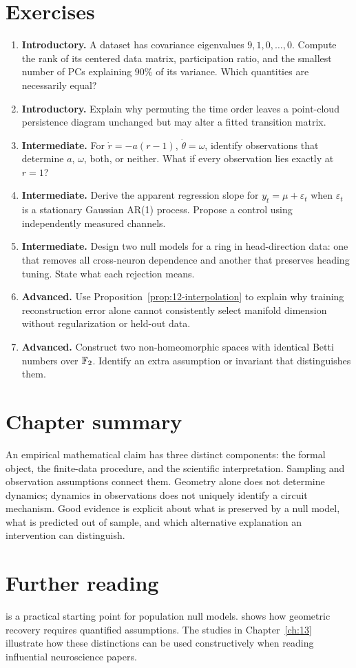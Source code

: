 \section*{Exercises}
\begin{enumerate}
\item \textbf{Introductory.} A dataset has covariance eigenvalues \(9,1,0,\ldots,0\). Compute the rank of its centered data matrix, participation ratio, and the smallest number of PCs explaining \(90\%\) of its variance. Which quantities are necessarily equal?
\item \textbf{Introductory.} Explain why permuting the time order leaves a point-cloud persistence diagram unchanged but may alter a fitted transition matrix.
\item \textbf{Intermediate.} For \(\dot r=-a(r-1)\), \(\dot\theta=\omega\), identify observations that determine \(a\), \(\omega\), both, or neither. What if every observation lies exactly at \(r=1\)?
\item \textbf{Intermediate.} Derive the apparent regression slope for \(y_t=\mu+\varepsilon_t\) when \(\varepsilon_t\) is a stationary Gaussian AR(1) process. Propose a control using independently measured channels.
\item \textbf{Intermediate.} Design two null models for a ring in head-direction data: one that removes all cross-neuron dependence and another that preserves heading tuning. State what each rejection means.
\item \textbf{Advanced.} Use Proposition~\ref{prop:12-interpolation} to explain why training reconstruction error alone cannot consistently select manifold dimension without regularization or held-out data.
\item \textbf{Advanced.} Construct two non-homeomorphic spaces with identical Betti numbers over \(\mathbb{F}_2\). Identify an extra assumption or invariant that distinguishes them.
\end{enumerate}

\section*{Chapter summary}
An empirical mathematical claim has three distinct components: the formal object, the finite-data procedure, and the scientific interpretation. Sampling and observation assumptions connect them. Geometry alone does not determine dynamics; dynamics in observations does not uniquely identify a circuit mechanism. Good evidence is explicit about what is preserved by a null model, what is predicted out of sample, and which alternative explanation an intervention can distinguish.

\section*{Further reading}
\citet{ev_elsayed2017} is a practical starting point for population null models. \citet{ev_niyogi2008} shows how geometric recovery requires quantified assumptions. The studies in Chapter~\ref{ch:13} illustrate how these distinctions can be used constructively when reading influential neuroscience papers.
